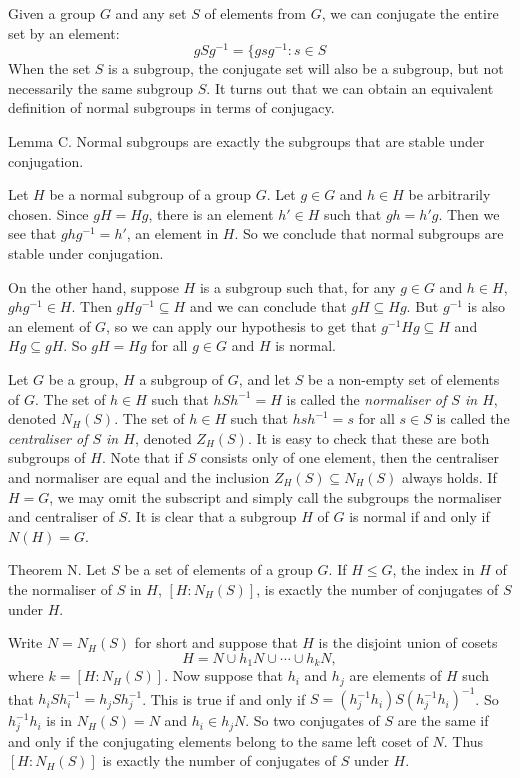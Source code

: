 Given a group $G$ and any set $S$ of elements from $G$, we can conjugate the entire set by an element:
$$gSg^{-1} = \{gsg^{-1} : s\in S$$
When the set $S$ is a subgroup, the conjugate set will also be a subgroup, but not necessarily the same subgroup $S$. It turns out that we can obtain an equivalent definition of normal subgroups in terms of conjugacy.

\proclaim Lemma C. Normal subgroups are exactly the subgroups that are stable under conjugation.

\proof Let $H$ be a normal subgroup of a group $G$. Let $g\in G$ and $h\in H$ be arbitrarily chosen. Since $gH=Hg$, there is an element $h'\in H$ such that $gh = h'g$. Then we see that $ghg^{-1} = h'$, an element in $H$. So we conclude that normal subgroups are stable under conjugation.

On the other hand, suppose $H$ is a subgroup such that, for any $g\in G$ and $h\in H$, $ghg^{-1}\in H$. Then $gHg^{-1}\subseteq H$ and we can conclude that $gH\subseteq Hg$. But $g^{-1}$ is also an element of $G$, so we can apply our hypothesis to get that $g^{-1}Hg\subseteq H$ and $Hg \subseteq gH$. So $gH=Hg$ for all $g\in G$ and $H$ is normal.\slug

Let $G$ be a group, $H$ a subgroup of $G$, and let $S$ be a non-empty set of elements of $G$. The set of $h\in H$ such that $hSh^{-1} = H$ is called the {\it normaliser of $S$ in $H$}, denoted $N_H(S)$. The set of $h\in H$ such that $hsh^{-1} = s$ for all $s\in S$ is called the {\it centraliser of $S$ in $H$}, denoted $Z_H(S)$. It is easy to check that these are both subgroups of $H$. Note that if $S$ consists only of one element, then the centraliser and normaliser are equal and the inclusion $Z_H(S) \subseteq N_H(S)$ always holds. If $H = G$, we may omit the subscript and simply call the subgroups the normaliser and centraliser of $S$. It is clear that a subgroup $H$ of $G$ is normal if and only if $N(H) = G$.

\proclaim Theorem N. Let $S$ be a set of elements of a group $G$. If $H\leq G$, the index in $H$ of the normaliser of $S$ in $H$, $[H:N_H(S)]$, is exactly the number of conjugates of $S$ under $H$.

\proof Write $N = N_H(S)$ for short and suppose that $H$ is the disjoint union of cosets
$$H = N \cup h_1N \cup \cdots \cup h_kN,$$
where $k = [H:N_H(S)]$. Now suppose that $h_i$ and $h_j$ are elements of $H$ such that $h_iSh_i^{-1} = h_jSh_j^{-1}$. This is true if and only if $S = (h_j^{-1}h_i)S(h_j^{-1}h_i)^{-1}$. So $h_j^{-1}h_i$ is in $N_H(S) = N$ and $h_i\in h_jN$. So two conjugates of $S$ are the same if and only if the conjugating elements belong to the same left coset of $N$. Thus $[H:N_H(S)]$ is exactly the number of conjugates of $S$ under $H$.\slug

